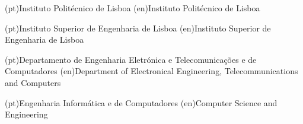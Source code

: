 
%



\ncuniversity*(pt){Instituto Politécnico de Lisboa}
\ncuniversity*(en){Instituto Politécnico de Lisboa}

\ncschool*(pt){Instituto Superior de Engenharia de Lisboa}
\ncschool*(en){Instituto Superior de Engenharia de Lisboa}

\ncdepartment*(pt){Departamento de Engenharia Eletrónica e Telecomunicações e de Computadores}
\ncdepartment*(en){Department of Electronical Engineering, Telecommunications and Computers}



\ncmajorfield(pt){Engenharia Informática e de Computadores}
\ncmajorfield(en){Computer Science and Engineering}




